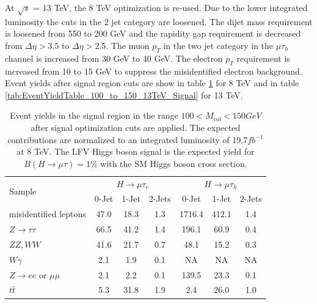 \documentclass[oneside, letterpaper, oldfontcommands]{memoir}
\begin{document}
\qquad At $\sqrt{s}$ = 13 TeV, the 8 TeV optimization is re-used. Due to the lower integrated luminosity the cuts in the 2 jet category are loosened. The dijet mass requirement is loosened from 550 to 200 GeV and the rapidity gap requirement is decreased from $\Delta \eta > 3.5$ to $\Delta \eta > 2.5$. The muon $p_{T}$ in the two jet category in the $\mu \tau_{h}$ channel is increased from 30 GeV to 40 GeV. The electron $p_{T}$ requirement is increased from 10 to 15 GeV to suppress the misidentified electron background. Event yields after signal region cuts are show in table \ref{tab:EventYieldTable_100_to_150_8TeV_Signal} for 8 TeV and in table \ref{tab:EventYieldTable_100_to_150_13TeV_Signal} for 13 TeV.


 \begin{table}[hbtp]
 \centering  \caption{Event yields in the signal region in the range $100 < M_\text{col} < 150GeV$ after signal optimization cuts are applied. The expected contributions are normalized to an integrated luminosity
of 19.7$fb^{-1}$ at 8 TeV. The LFV Higgs boson signal is the expected yield for $B(H \rightarrow \mu \tau)=1\%$ with the SM Higgs boson cross section.}
  \label{tab:EventYieldTable_100_to_150_8TeV_Signal}
  \begin{tabular}{lccc|ccc} \hline
        \multirow{2}{*}{Sample}                                & \multicolumn{3}{c}{$H \rightarrow \mu \tau_{e}$}                &     \multicolumn{3}{c}{$H \rightarrow \mu \tau_{h}$}     \\ \cline{2-7}
                                              &  0-Jet            & 1-Jet            & 2-Jets               &  0-Jet             & 1-Jet            & 2-Jets  \\ \hline
    misidentified leptons                    &  47.0  &   18.3     &  1.3 & 1716.4 & 412.1 & 1.4\\
    $ Z \rightarrow \tau \tau$                    & 66.5   & 41.2      &  1.4 & 196.1   & 60.9  & 0.4  \\
    $ ZZ,WW$                       & 41.6   &  21.7      &  0.7 & 48.1   & 15.2  & 0.3\\
    $ W\gamma$                             &   2.1  &  1.9     &  0.1 &NA & NA & NA    \\
    $ Z \rightarrow ee$ or $\mu \mu$          &  2.1   &  2.2      &  0.1 & 139.5 & 23.3& 0.1  \\
    $t\bar{t}     $                            &  5.3   & 31.8      & 1.9 &2.4 & 26.0 & 1.0    \\

\end{tabular}
\end{table}
\end{document}

